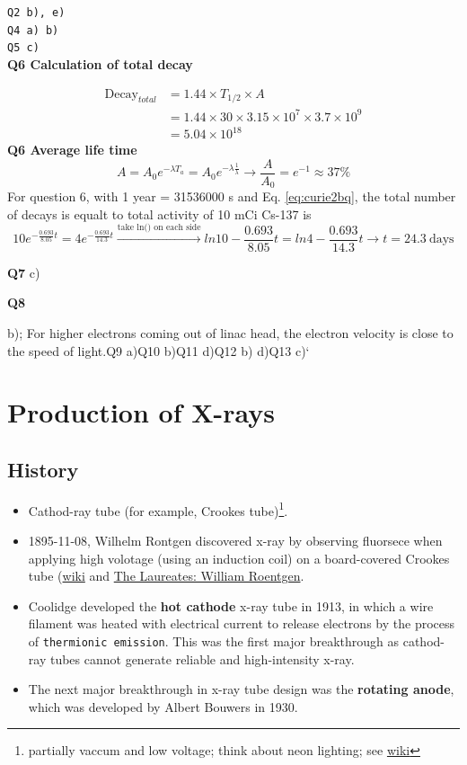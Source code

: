 \documentclass[]{book}
\providecommand{\tightlist}{%
  \setlength{\itemsep}{0pt}\setlength{\parskip}{0pt}}
\let\rmarkdownfootnote\footnote%
\def\footnote{\protect\rmarkdownfootnote}
\theoremstyle{definition}
\theoremstyle{definition}
\theoremstyle{definition}
\theoremstyle{remark}
\begin{document}
\texttt{Q2\ b),\ e)}\\
\texttt{Q4\ a)\ b)}\\
\texttt{Q5\ c)}\\
\textbf{Q6 Calculation of total decay}

\[
\begin{aligned}
\text{Decay}_{total} &= 1.44 \times T_{1/2} \times {A} \\
    &= 1.44 \times 30 \times 3.15\times 10^7 \times 3.7\times 10^9 \\
    &= \boxed{5.04\times 10^{18}}
\end{aligned}
\] \textbf{Q6 Average life time} \[
A=A_0e^{-\lambda T_a}=A_0e^{-\lambda \frac{1}{\lambda}}\rightarrow \frac{A}{A_0}=e^{-1} \approx \boxed{37\%}
\] For question 6, with 1 year = 31536000 s and Eq. \eqref{eq:curie2bq},
the total number of decays is equalt to total activity of 10 mCi Cs-137
is \[
10e^{-\frac{0.693}{8.05}t} = 4e^{-\frac{0.693}{14.3}t} \xrightarrow{\text{take ln() on each side}}
  ln10-\frac{0.693}{8.05}t = ln4 -\frac{0.693}{14.3}t \rightarrow t = \boxed{24.3\ \text{days}}
\]

\textbf{Q7} c)

\textbf{Q8}

b); For higher electrons coming out of linac head, the electron velocity
is close to the speed of light.\texttt{}Q9 a)\texttt{}Q10 b)\texttt{}Q11
d)\texttt{}Q12 b) d)\texttt{}Q13 c)`

\chapter{Production of X-rays}\label{prox}

\section{History}\label{history}

\begin{itemize}
\tightlist
\item
  Cathod-ray tube (for example, Crookes tube)\footnote{partially vaccum
    and low voltage; think about neon lighting; see
    \href{https://en.wikipedia.org/wiki/Crookes_tube}{wiki}}.
\item
  1895-11-08, Wilhelm Rontgen discovered x-ray by observing fluorsece
  when applying high volotage (using an induction coil) on a
  board-covered Crookes tube
  (\href{https://en.wikipedia.org/wiki/Wilhelm_Röntgen}{wiki} and
  \href{https://www.youtube.com/watch?v=qVn3mgt8Two}{The Laureates:
  William Roentgen}.
\item
  Coolidge developed the \textbf{hot cathode} x-ray tube in 1913, in
  which a wire filament was heated with electrical current to release
  electrons by the process of \texttt{thermionic\ emission}. This was
  the first major breakthrough as cathod-ray tubes cannot generate
  reliable and high-intensity x-ray.
\item
  The next major breakthrough in x-ray tube design was the
  \textbf{rotating anode}, which was developed by Albert Bouwers in
  1930.
\end{itemize}
\end{document}
